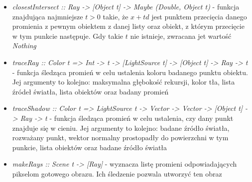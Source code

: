 \documentclass[11pt,a4paper]{article}
\begin{document}
\begin{itemize}
\begin{itemize}
{    imWidth :: Int,
    imHeight :: Int,
    imPixels :: [t]
\}} - obraz opisany przez jego wymiary oraz zbiór pikseli w wybranej reprezentacji koloru
\end{itemize}
\item\textit{closestIntersect :: Ray -> [Object t] -> Maybe (Double, Object t)} - funkcja znajdująca najmniejsze $t > 0$ takie, że $x + td$ jest punktem przecięcia danego promienia z pewnym obiektem z danej listy oraz obiekt, z którym przecięcie w tym punkcie następuje. Gdy takie $t$ nie istnieje, zwracana jet wartość \textit{Nothing}
\item\textit{traceRay :: Color t => Int -> t -> [LightSource t] -> [Object t] -> Ray -> t} - funkcja śledząca promień w celu ustalenia koloru badanego punktu obiektu. Jej argumenty to kolejno: maksymalna głębokość rekursji, kolor tła, lista źródeł światła, lista obiektów oraz badany promień
\item\textit{traceShadow :: Color t => LightSource t -> Vector -> Vector -> [Object t] -> Ray -> t} - funkcja śledząca promień w celu ustalenia, czy dany punkt znajduje się w cieniu. Jej argumenty to kolejno: badane źródło światła, rozważany punkt, wektor normalny prostopadły do powierzchni w tym punkcie, lista obiektów oraz badane źródło światła
\item\textit{makeRays :: Scene t -> [Ray]} - wyznacza listę promieni odpowiadających pikselom gotowego obrazu. Ich śledzenie pozwala utworzyć ten obraz
\end{itemize}
\end{document}
